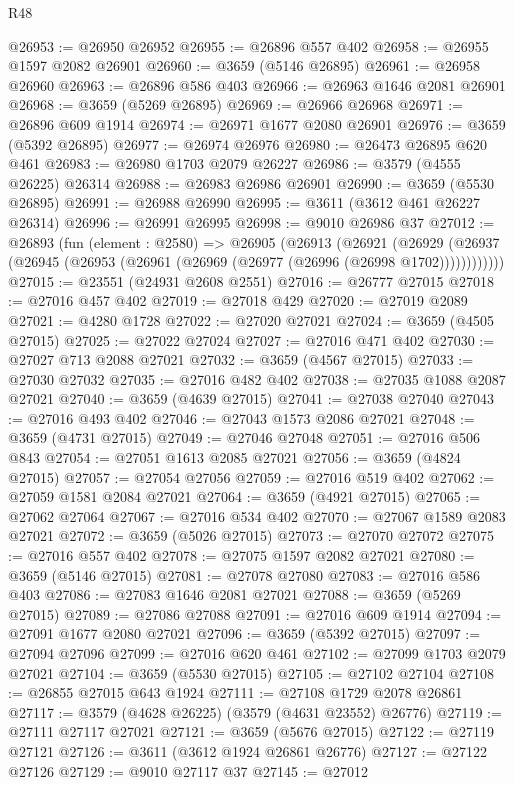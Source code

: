 \begin{lexlean}{R48}
\begin{coremodule}
@26953 := @26950 @26952
@26955 := @26896 @557 @402
@26958 := @26955 @1597 @2082 @26901
@26960 := @3659 (@5146 @26895)
@26961 := @26958 @26960
@26963 := @26896 @586 @403
@26966 := @26963 @1646 @2081 @26901
@26968 := @3659 (@5269 @26895)
@26969 := @26966 @26968
@26971 := @26896 @609 @1914
@26974 := @26971 @1677 @2080 @26901
@26976 := @3659 (@5392 @26895)
@26977 := @26974 @26976
@26980 := @26473 @26895 @620 @461
@26983 := @26980 @1703 @2079 @26227
@26986 := @3579 (@4555 @26225) @26314
@26988 := @26983 @26986 @26901
@26990 := @3659 (@5530 @26895)
@26991 := @26988 @26990
@26995 := @3611 (@3612 @461 @26227 @26314)
@26996 := @26991 @26995
@26998 := @9010 @26986 @37
@27012 := @26893
    (fun (element : @2580) =>
    @26905
      (@26913
        (@26921
          (@26929 (@26937 (@26945 (@26953 (@26961 (@26969 (@26977 (@26996 (@26998 @1702))))))))))))
@27015 := @23551 (@24931 @2608 @2551)
@27016 := @26777 @27015
@27018 := @27016 @457 @402
@27019 := @27018 @429
@27020 := @27019 @2089
@27021 := @4280 @1728
@27022 := @27020 @27021
@27024 := @3659 (@4505 @27015)
@27025 := @27022 @27024
@27027 := @27016 @471 @402
@27030 := @27027 @713 @2088 @27021
@27032 := @3659 (@4567 @27015)
@27033 := @27030 @27032
@27035 := @27016 @482 @402
@27038 := @27035 @1088 @2087 @27021
@27040 := @3659 (@4639 @27015)
@27041 := @27038 @27040
@27043 := @27016 @493 @402
@27046 := @27043 @1573 @2086 @27021
@27048 := @3659 (@4731 @27015)
@27049 := @27046 @27048
@27051 := @27016 @506 @843
@27054 := @27051 @1613 @2085 @27021
@27056 := @3659 (@4824 @27015)
@27057 := @27054 @27056
@27059 := @27016 @519 @402
@27062 := @27059 @1581 @2084 @27021
@27064 := @3659 (@4921 @27015)
@27065 := @27062 @27064
@27067 := @27016 @534 @402
@27070 := @27067 @1589 @2083 @27021
@27072 := @3659 (@5026 @27015)
@27073 := @27070 @27072
@27075 := @27016 @557 @402
@27078 := @27075 @1597 @2082 @27021
@27080 := @3659 (@5146 @27015)
@27081 := @27078 @27080
@27083 := @27016 @586 @403
@27086 := @27083 @1646 @2081 @27021
@27088 := @3659 (@5269 @27015)
@27089 := @27086 @27088
@27091 := @27016 @609 @1914
@27094 := @27091 @1677 @2080 @27021
@27096 := @3659 (@5392 @27015)
@27097 := @27094 @27096
@27099 := @27016 @620 @461
@27102 := @27099 @1703 @2079 @27021
@27104 := @3659 (@5530 @27015)
@27105 := @27102 @27104
@27108 := @26855 @27015 @643 @1924
@27111 := @27108 @1729 @2078 @26861
@27117 := @3579 (@4628 @26225) (@3579 (@4631 @23552) @26776)
@27119 := @27111 @27117 @27021
@27121 := @3659 (@5676 @27015)
@27122 := @27119 @27121
@27126 := @3611 (@3612 @1924 @26861 @26776)
@27127 := @27122 @27126
@27129 := @9010 @27117 @37
@27145 := @27012

\end{coremodule}
\end{lexlean}
